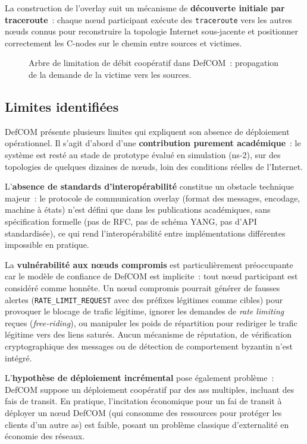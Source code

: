 La construction de l'overlay suit un mécanisme de \textbf{découverte initiale par traceroute}~: chaque n\oe{}ud participant exécute des \texttt{traceroute} vers les autres n\oe{}uds connus pour reconstruire la topologie Internet sous-jacente et positionner correctement les C-nodes sur le chemin entre sources et victimes.

\begin{figure}[H]
    \centering
 
    \caption{Arbre de limitation de débit coopératif dans DefCOM~: propagation de la demande de la victime vers les sources.}
    \label{fig:defcom_tree}
\end{figure}

\subsection{Limites identifiées}

DefCOM présente plusieurs limites qui expliquent son absence de déploiement opérationnel. Il s'agit d'abord d'une \textbf{contribution purement académique}~: le système est resté au stade de prototype évalué en simulation (ns-2), sur des topologies de quelques dizaines de n\oe{}uds, loin des conditions réelles de l'Internet.

L'\textbf{absence de standards d'interopérabilité} constitue un obstacle technique majeur~: le protocole de communication overlay (format des messages, encodage, machine à états) n'est défini que dans les publications académiques, sans spécification formelle (pas de RFC, pas de schéma YANG, pas d'API standardisée), ce qui rend l'interopérabilité entre implémentations différentes impossible en pratique.

La \textbf{vulnérabilité aux n\oe{}uds compromis} est particulièrement préoccupante car le modèle de confiance de DefCOM est implicite~: tout n\oe{}ud participant est considéré comme honnête. Un n\oe{}ud compromis pourrait générer de fausses alertes (\texttt{RATE\_LIMIT\_REQUEST} avec des préfixes légitimes comme cibles) pour provoquer le blocage de trafic légitime, ignorer les demandes de \textit{rate limiting} reçues (\textit{free-riding}), ou manipuler les poids de répartition pour rediriger le trafic légitime vers des liens saturés. Aucun mécanisme de réputation, de vérification cryptographique des messages ou de détection de comportement byzantin n'est intégré.

L'\textbf{hypothèse de déploiement incrémental} pose également problème~: DefCOM suppose un déploiement coopératif par des \glspl{as} multiples, incluant des \glspl{fai} de transit. En pratique, l'incitation économique pour un \gls{fai} de transit à déployer un n\oe{}ud DefCOM (qui consomme des ressources pour protéger les clients d'un autre \gls{as}) est faible, posant un problème classique d'externalité en économie des réseaux.

